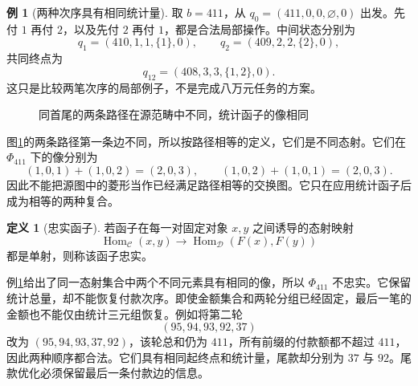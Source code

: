 \documentclass[UTF8,a4paper]{ctexbook}
\theoremstyle{definition}
\newtheorem{definition}[theorem]{定义}
\newtheorem{example}[theorem]{例}
\numberwithin{equation}{chapter}
\newcommand{\1}{\mathbf{1}}
\begin{document}
\begin{example}[两种次序具有相同统计量]\label{cat:nonfaithful-example}
取 $b=411$，从 $q_0=(411,0,0,\varnothing,0)$ 出发。先付 $1$ 再付 $2$，以及先付 $2$ 再付 $1$，都是合法局部操作。中间状态分别为
\[
q_1=(410,1,1,\{1\},0),\qquad
q_2=(409,2,2,\{2\},0),
\]
共同终点为
\[
q_{12}=(408,3,3,\{1,2\},0).
\]
这只是比较两笔次序的局部例子，不是完成八万元任务的方案。

\begin{figure}[htbp]
\centering
{}
\caption{同首尾的两条路径在源范畴中不同，统计函子的像相同}
\label{cat:diamond}
\end{figure}

图\ref{cat:diamond}的两条路径第一条边不同，所以按路径相等的定义，它们是不同态射。它们在 $\Phi_{411}$ 下的像分别为
\[
(1,0,1)+(1,0,2)=(2,0,3),
\qquad
(1,0,2)+(1,0,1)=(2,0,3).
\]
因此不能把源图中的菱形当作已经满足路径相等的交换图。它只在应用统计函子后成为相等的两种复合。
\end{example}

\begin{definition}[忠实函子]
若函子在每一对固定对象 $x,y$ 之间诱导的态射映射
\[
\operatorname{Hom}_{\mathcal C}(x,y)
\longrightarrow
\operatorname{Hom}_{\mathcal D}(F(x),F(y))
\]
都是单射，则称该函子忠实。
\end{definition}

例\ref{cat:nonfaithful-example}给出了同一态射集合中两个不同元素具有相同的像，所以 $\Phi_{411}$ 不忠实。它保留统计总量，却不能恢复付款次序。即使金额集合和两轮分组已经固定，最后一笔的金额也不能仅由统计三元组恢复。例如将第二轮
\[
(95,94,93,92,37)
\]
改为 $(95,94,93,37,92)$，该轮总和仍为 $411$，所有前缀的付款额都不超过 $411$，因此两种顺序都合法。它们具有相同起终点和统计量，尾款却分别为 $37$ 与 $92$。尾款优化必须保留最后一条付款边的信息。
\end{document}
